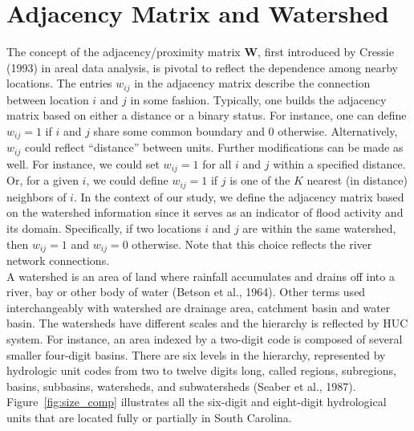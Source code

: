 \documentclass{svjour3}
\renewcommand\hl[1]{#1}
\begin{document}
\section{Adjacency Matrix and Watershed}\label{sec:watershed}
The concept of the adjacency/proximity matrix $\mathbf W$, first introduced by  Cressie (1993) in areal data analysis, is pivotal to reflect the dependence among nearby locations.
The entries $ w_{ij}$ in the adjacency matrix describe the connection between location $ i$ and $j$ in some fashion.
Typically, one builds the adjacency matrix based on either a distance or a binary status.
For instance, one can define $w_{ij} = 1$ if $i$ and $j$ share some common boundary and 0 otherwise.
Alternatively, $w_{ij}$ could reflect ``distance'' between units.
Further modifications can be made as well.
For instance, we could set $w_{ij} = 1$ for all $i$ and $j$ within a specified distance.
Or,  for a given $i$, we could define $w_{ij} = 1$ if $j$ is one of the $K$ nearest (in distance) neighbors of $i$.
In the context of our study, we define the adjacency matrix based on the watershed information since it serves as an indicator of flood activity and its domain.
Specifically, if two locations $ i$ and $ j$ are within the same watershed, then $ w_{ij} = 1$ and $ w_{ij} = 0$ otherwise. \hl{Note that this choice reflects the river network connections.}\\

A watershed is an area of land where rainfall accumulates and drains off into a river, bay or other body of water (Betson et al., 1964).
Other terms used interchangeably with watershed are drainage area, catchment basin and water basin.
The watersheds have different scales and the hierarchy is reflected by HUC system.
For instance, an area indexed by a two-digit code is composed of several smaller four-digit basins.
There are six levels in the hierarchy, represented by hydrologic unit codes from two to twelve digits long, called regions, subregions, basins, subbasins, watersheds, and subwatersheds (Seaber et al., 1987).
Figure~\ref{fig:size_comp} illustrates all the six-digit and eight-digit hydrological units that are located fully or partially in South Carolina.
\end{document}
